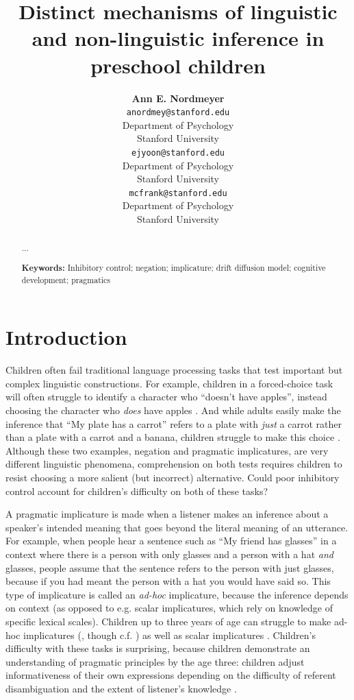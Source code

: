 \documentclass[10pt,letterpaper]{article}
\title{Distinct mechanisms of linguistic and non-linguistic inference in preschool children}
\author{{\large \bf Ann E. Nordmeyer} \\
  \texttt{anordmey@stanford.edu} \\
  Department of Psychology \\
  Stanford University
  \And {\large \bf Erica J. Yoon} \\
  \texttt{ejyoon@stanford.edu} \\
  Department of Psychology \\
  Stanford University
  \And {\large \bf Michael C. Frank} \\
  \texttt{mcfrank@stanford.edu} \\
  Department of Psychology \\
  Stanford University}
\newcommand{\aen}[1]{\textcolor{DarkOrange}{[aen: #1]}}
\begin{document}
\maketitle


\begin{abstract}

...

\textbf{Keywords:} 
Inhibitory control; negation; implicature; drift diffusion model; cognitive development; pragmatics

\end{abstract}


\section{Introduction}
Children often fail traditional language processing tasks that test important but complex linguistic constructions.  For example, children in a forced-choice task will often struggle to identify a character who ``doesn't have apples'', instead choosing the character who \emph{does} have apples \cite{nordmeyer2014b}.  And while adults easily make the inference that ``My plate has a carrot'' refers to a plate with \emph{just} a carrot rather than a plate with a carrot and a banana, children struggle to make this choice \cite{yoonchildren}.   Although these two examples, negation and pragmatic implicatures, are very different linguistic phenomena, comprehension on both tests requires children to resist choosing a more salient (but incorrect) alternative.  Could poor inhibitory control account for children's difficulty on both of these tasks?

A pragmatic implicature \cite{grice1975} is made when a listener makes an inference about a speaker's intended meaning that goes beyond the literal meaning of an utterance.  For example, when people hear a sentence such as ``My friend has glasses'' in a context where there is a person with only glasses and a person with a hat \emph{and} glasses, people assume that the sentence refers to the person with just glasses, because if you had meant the person with a hat you would have said so.  This type of implicature is called an \emph{ad-hoc} implicature, because the inference depends on context (as opposed to e.g. scalar implicatures, which rely on knowledge of specific lexical scales).  Children up to three years of age can struggle to make ad-hoc implicatures (, though c.f. ) as well as scalar implicatures \cite{huang2009}.  Children's difficulty with these tasks is surprising, because children demonstrate an understanding of pragmatic principles by the age three: children adjust informativeness of their own expressions depending on the difficulty of referent disambiguation \cite{matthews2006} and the extent of listener's knowledge \cite{matthews2012tw}.  %
\end{document}
